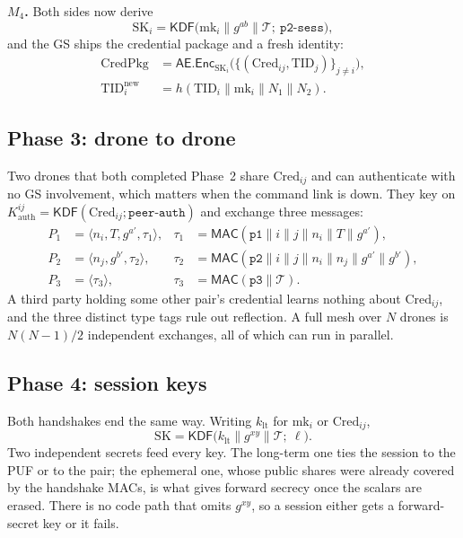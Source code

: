 \documentclass[conference]{IEEEtran}
\begin{document}
\textbf{$M_4$.} Both sides now derive
\begin{equation}
\text{SK}_i = \mathsf{KDF}\big(\text{mk}_i \| g^{ab} \| \mathcal{T};\ \texttt{p2-sess}\big),
\label{eq:sk2}
\end{equation}
and the GS ships the credential package and a fresh identity:
\begin{align}
\text{CredPkg} &= \mathsf{AE}.\mathsf{Enc}_{\text{SK}_i}\big(\{(\text{Cred}_{ij}, \text{TID}_j)\}_{j \ne i}\big),\\
\text{TID}_i^{\text{new}} &= h(\text{TID}_i \| \text{mk}_i \| N_1 \| N_2).
\end{align}

\subsection{Phase 3: drone to drone}
\label{sec:p3}

Two drones that both completed Phase~2 share $\text{Cred}_{ij}$ and can
authenticate with no GS involvement, which matters when the command link is
down. They key on $K^{ij}_{\text{auth}} = \mathsf{KDF}(\text{Cred}_{ij}; \texttt{peer-auth})$
and exchange three messages:
\begin{align}
P_1 &= \langle n_i, T, g^{a'}, \tau_1\rangle, &
\tau_1 &= \mathsf{MAC}(\texttt{p1} \| i \| j \| n_i \| T \| g^{a'}),\\
P_2 &= \langle n_j, g^{b'}, \tau_2\rangle, &
\tau_2 &= \mathsf{MAC}(\texttt{p2} \| i \| j \| n_i \| n_j \| g^{a'} \| g^{b'}),\\
P_3 &= \langle \tau_3\rangle, &
\tau_3 &= \mathsf{MAC}(\texttt{p3} \| \mathcal{T}).
\end{align}
A third party holding some other pair's credential learns nothing about
$\text{Cred}_{ij}$, and the three distinct type tags rule out reflection. A
full mesh over $N$ drones is $N(N-1)/2$ independent exchanges, all of which can
run in parallel.

\subsection{Phase 4: session keys}
\label{sec:p4}

Both handshakes end the same way. Writing $k_{\text{lt}}$ for $\text{mk}_i$ or
$\text{Cred}_{ij}$,
\begin{equation}
\text{SK} = \mathsf{KDF}\big(k_{\text{lt}} \| g^{xy} \| \mathcal{T};\ \ell\big).
\label{eq:sk}
\end{equation}
Two independent secrets feed every key. The long-term one ties the session to
the PUF or to the pair; the ephemeral one, whose public shares were already
covered by the handshake MACs, is what gives forward secrecy once the scalars
are erased. There is no code path that omits $g^{xy}$, so a session either gets
a forward-secret key or it fails.
\end{document}
